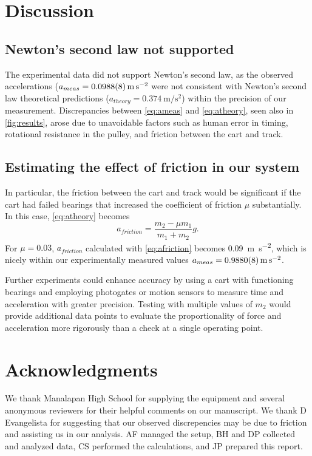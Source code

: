 \documentclass[reprint,amsmath,amssymb,aps]{revtex4-2}
\begin{document}




\section{Discussion}
\subsection{Newton's second law not supported}
The experimental data did not support Newton’s second law, as the observed accelerations ($a_{meas}=\qty{0.0988\pm0.0008}{\meter\per\second\squared}$ were not consistent with Newton's second law theoretical predictions ($a_{theory}=\qty{0.374}{\meter\per\second\squared}$) within the precision of our measurement. Discrepancies between \cref{eq:ameas} and \cref{eq:atheory}, seen also in \cref{fig:results}, arose due to unavoidable factors such as human error in timing, rotational resistance in the pulley, and friction between the cart and track.

\subsection{Estimating the effect of friction in our system}
In particular, the friction between the cart and track would be significant if the cart had failed bearings that increased the coefficient of friction $\mu$ substantially. In this case, \cref{eq:atheory} becomes
\begin{equation}
a_{friction} = \dfrac{m_2 - \mu m_1}{m_1 + m_2} g.
\label{eq:afriction}
\end{equation}
For $\mu=0.03$, $a_{friction}$ calculated with \cref{eq:afriction} becomes \qty{0.09}{\meter\per\second\squared}, which is nicely within our experimentally measured values $a_{meas}=\qty{0.988\pm0.0008}{\meter\per\second\squared}$. 

Further experiments could enhance accuracy by using a cart with functioning bearings and employing photogates or motion sensors to measure time and acceleration with greater precision. Testing with multiple values of $m_2$ would provide additional data points to evaluate the proportionality of force and acceleration more rigorously than a check at a single operating point. 





\section{Acknowledgments}
We thank Manalapan High School for supplying the equipment and several anonymous reviewers for their helpful comments on our manuscript. We thank D Evangelista for suggesting that our observed discrepencies may be due to friction and assisting us in our analysis. AF managed the setup, BH and DP collected and analyzed data, CS performed the calculations, and JP prepared this report.

%

\end{document}
